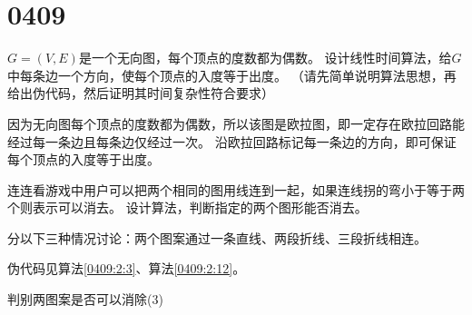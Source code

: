 \section{0409}\label{sec:0409}
\begin{questions}

    \question $G=(V,E)$是一个无向图，每个顶点的度数都为偶数。
    设计线性时间算法，给$G$中每条边一个方向，使每个顶点的入度等于出度。
    （请先简单说明算法思想，再给出伪代码，然后证明其时间复杂性符合要求）

    \begin{solution}
        因为无向图每个顶点的度数都为偶数，所以该图是欧拉图，即一定存在欧拉回路能经过每一条边且每条边仅经过一次。
        沿欧拉回路标记每一条边的方向，即可保证每个顶点的入度等于出度。
    \end{solution}

    \question 连连看游戏中用户可以把两个相同的图用线连到一起，如果连线拐的弯小于等于两个则表示可以消去。
    设计算法，判断指定的两个图形能否消去。

    \begin{solution}
        分以下三种情况讨论：两个图案通过一条直线、两段折线、三段折线相连。

        伪代码见算法\ref{0409:2:3}、算法\ref{0409:2:12}。
    \end{solution}




    \begin{algorithm}
        \caption{判别两图案是否可以消除(3)}\label{0409:2:3}
        \begin{algorithmic}[1]


\end{algorithmic}
\end{algorithm}
\end{questions}
